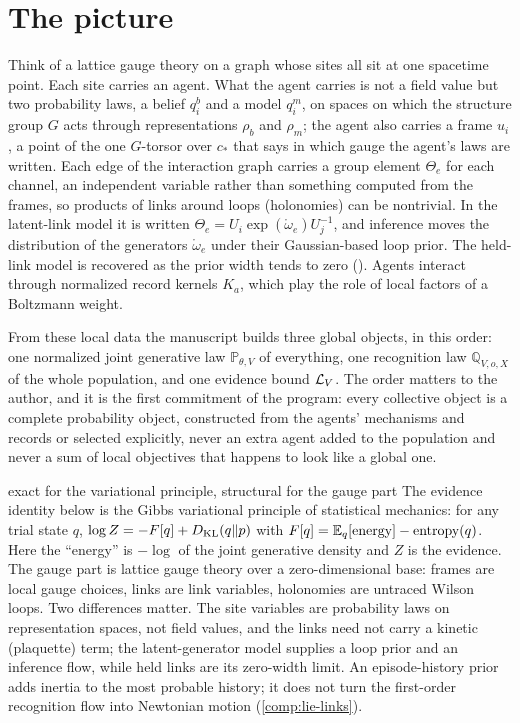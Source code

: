 \section{The picture}
\label{comp:ch01-picture}

Think of a lattice gauge theory on a graph whose sites all sit at one spacetime point. Each site
carries an agent. What the agent carries is not a field value but two probability laws, a belief
$q_i^b$ and a model $q_i^m$, on spaces on which the structure group $G$ acts through representations
$\rho_b$ and $\rho_m$; the agent also carries a frame $u_i$, a point of the one $G$-torsor over $c_*$
that says in which gauge the agent's laws are written. Each edge of the interaction graph carries a
group element $\Theta_e$ for each channel, an independent variable rather than something computed from
the frames, so products of links around loops (holonomies) can be nontrivial. In the latent-link
model it is written $\Theta_e=U_i\exp(\mathring\omega_e)U_j^{-1}$, and inference moves the
distribution of the generators $\mathring\omega_e$ under their Gaussian-based loop prior.
The held-link model is recovered as the prior width tends to zero
(). Agents interact through
normalized record kernels $K_a$, which play the role of local factors of a Boltzmann weight.

From these local data the manuscript builds three global objects, in this order: one normalized joint
generative law $\mathbb P_{\theta,V}$ of everything, one recognition law $\mathbb Q_{V,o,X}$ of the
whole population, and one evidence bound $\mathcal L_V$. The order matters to the author, and it is the
first commitment of the program: every collective object is a complete probability object,
constructed from the agents' mechanisms and records or selected explicitly, never an extra agent added
to the population and never a sum of local objectives that happens to look like a global one.

\begin{analogy}{exact for the variational principle, structural for the gauge part}
The evidence identity below is the Gibbs variational principle of statistical mechanics: for any trial
state $q$, $\log Z=-F[q]+D_{\mathrm{KL}}(q\Vert p)$ with $F[q]=\mathbb E_q[\text{energy}]-\text{entropy}(q)$. Here the
``energy'' is $-\log$ of the joint generative density and $Z$ is the evidence. The gauge part is lattice
gauge theory over a zero-dimensional base: frames are local gauge choices, links are link variables,
holonomies are untraced Wilson loops. Two differences matter. The site variables are probability laws
on representation spaces, not field values, and the links need not carry a kinetic (plaquette) term;
the latent-generator model supplies a loop prior and an inference flow, while held links are its
zero-width limit. An episode-history prior adds inertia to the most probable history; it does not
turn the first-order recognition flow into Newtonian motion (\cref{comp:lie-links}).
\end{analogy}

